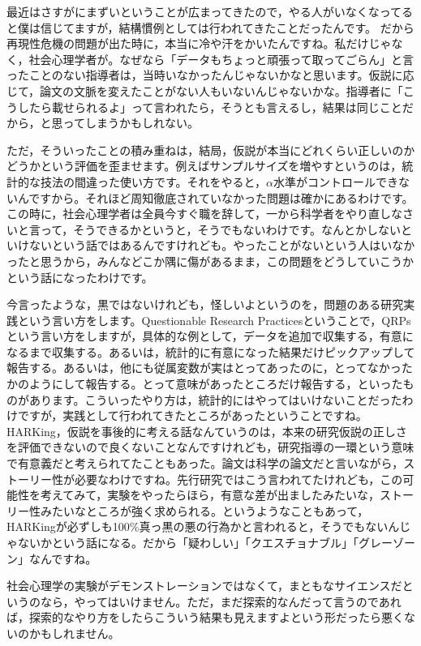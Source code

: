 \documentclass{ltjsbook}
\begin{document}
最近はさすがにまずいということが広まってきたので，やる人がいなくなってると僕は信じてますが，結構慣例としては行われてきたことだったんです。
だから再現性危機の問題が出た時に，本当に冷や汗をかいたんですね。私だけじゃなく，社会心理学者が。なぜなら「データもちょっと頑張って取ってごらん」と言ったことのない指導者は，当時いなかったんじゃないかなと思います。仮説に応じて，論文の文脈を変えたことがない人もいないんじゃないかな。指導者に「こうしたら載せられるよ」って言われたら，そうとも言えるし，結果は同じことだから，と思ってしまうかもしれない。

ただ，そういったことの積み重ねは，結局，仮説が本当にどれくらい正しいのかどうかという評価を歪ませます。例えばサンプルサイズを増やすというのは，統計的な技法の間違った使い方です。それをやると，$\alpha$水準がコントロールできないんですから。それほど周知徹底されていなかった問題は確かにあるわけです。この時に，社会心理学者は全員今すぐ職を辞して，一から科学者をやり直しなさいと言って，そうできるかというと，そうでもないわけです。なんとかしないといけないという話ではあるんですけれども。やったことがないという人はいなかったと思うから，みんなどこか隅に傷があるまま，この問題をどうしていこうかという話になったわけです。

今言ったような，黒ではないけれども，怪しいよというのを，問題のある研究実践という言い方をします。Questionable Research Practicesということで，QRPsという言い方をしますが，具体的な例として，データを追加で収集する，有意になるまで収集する。あるいは，統計的に有意になった結果だけピックアップして報告する。あるいは，他にも従属変数が実はとってあったのに，とってなかったかのようにして報告する。とって意味があったところだけ報告する，といったものがあります。こういったやり方は，統計的にはやってはいけないことだったわけですが，実践として行われてきたところがあったということですね。HARKing，仮説を事後的に考える話なんていうのは，本来の研究仮説の正しさを評価できないので良くないことなんですけれども，研究指導の一環という意味で有意義だと考えられてたこともあった。論文は科学の論文だと言いながら，ストーリー性が必要なわけですね。先行研究ではこう言われてたけれども，この可能性を考えてみて，実験をやったらほら，有意な差が出ましたみたいな，ストーリー性みたいなところが強く求められる。というようなこともあって，HARKingが必ずしも100\%真っ黒の悪の行為かと言われると，そうでもないんじゃないかという話になる。だから「疑わしい」「クエスチョナブル」「グレーゾーン」なんですね。

社会心理学の実験がデモンストレーションではなくて，まともなサイエンスだというのなら，やってはいけません。ただ，まだ探索的なんだって言うのであれば，探索的なやり方をしたらこういう結果も見えますよという形だったら悪くないのかもしれません。
\end{document}
